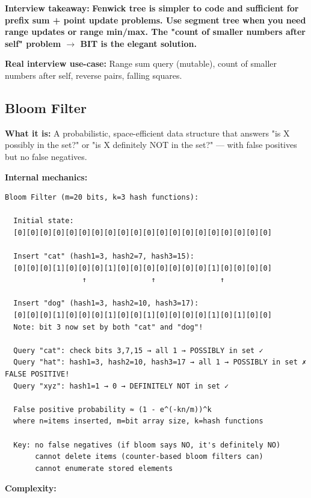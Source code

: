 \documentclass[11pt]{article}
\begin{document}
\textbf{Interview takeaway:} \textbf{Fenwick tree is simpler to code and sufficient for prefix sum + point update problems. Use segment tree when you need range updates or range min/max. The "count of smaller numbers after self" problem \(\rightarrow\) BIT is the elegant solution.}

\textbf{Real interview use-case:} Range sum query (mutable), count of smaller numbers after self, reverse pairs, falling squares.

\subsection{Bloom Filter}\label{bloom-filter}

\textbf{What it is:} A probabilistic, space-efficient data structure that answers "is X possibly in the set?" or "is X definitely NOT in the set?" --- with false positives but no false negatives.

\textbf{Internal mechanics:}

\setcodelang{}

\begin{verbatim}
Bloom Filter (m=20 bits, k=3 hash functions):

  Initial state:
  [0][0][0][0][0][0][0][0][0][0][0][0][0][0][0][0][0][0][0][0]

  Insert "cat" (hash1=3, hash2=7, hash3=15):
  [0][0][0][1][0][0][0][1][0][0][0][0][0][0][0][1][0][0][0][0]
                  ↑               ↑               ↑

  Insert "dog" (hash1=3, hash2=10, hash3=17):
  [0][0][0][1][0][0][0][1][0][0][1][0][0][0][0][1][0][1][0][0]
  Note: bit 3 now set by both "cat" and "dog"!

  Query "cat": check bits 3,7,15 → all 1 → POSSIBLY in set ✓
  Query "hat": hash1=3, hash2=10, hash3=17 → all 1 → POSSIBLY in set ✗ FALSE POSITIVE!
  Query "xyz": hash1=1 → 0 → DEFINITELY NOT in set ✓

  False positive probability ≈ (1 - e^(-kn/m))^k
  where n=items inserted, m=bit array size, k=hash functions

  Key: no false negatives (if bloom says NO, it's definitely NO)
       cannot delete items (counter-based bloom filters can)
       cannot enumerate stored elements
\end{verbatim}

\textbf{Complexity:}
\end{document}
